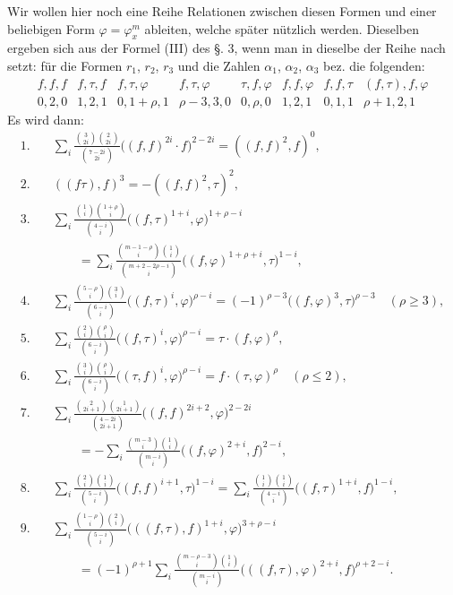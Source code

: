 \documentclass[10pt]{article}
\begin{document}
Wir wollen hier noch eine Reihe Relationen zwischen diesen Formen und einer beliebigen Form $\varphi=\varphi_x^m$ ableiten, welche später nützlich werden. Dieselben ergeben sich aus der Formel (III) des §. 3, wenn man in dieselbe der Reihe nach setzt: für die Formen $r_1$, $r_2$, $r_3$ und die Zahlen $\alpha_1$, $\alpha_2$, $\alpha_3$ bez. die folgenden:
\[
\begin{array}{ccccccccc}
f,f,f&f,\tau,f&f,\tau,\varphi&f,\tau,\varphi&\tau,f,\varphi&f,f,\varphi&f,f,\tau&(f,\tau),f,\varphi\\
0,2,0&1,2,1&0,1+\rho,1&\rho-3,3,0&0,\rho,0&1,2,1&0,1,1&\rho+1,2,1
\end{array}
\]
Es wird dann:
\begin{align*}
1.\quad &\sum_i\frac{\binom{3}{2i}\binom{2}{2i}}{\binom{7-2i}{2i}}\bigl((f,f)^{2i}\cdot f\bigr)^{2-2i}=((f,f)^2,f)^0,\\
2.\quad &((f\tau),f)^3=-((f,f)^2,\tau)^2,\\
3.\quad &\sum_i\frac{\binom{1}{i}\binom{1+\rho}{i}}{\binom{4-i}{i}}\bigl((f,\tau)^{1+i},\varphi\bigr)^{1+\rho-i}\\
&\qquad=\sum_i\frac{\binom{m-1-\rho}{i}\binom{1}{i}}{\binom{m+2-2\rho-i}{i}}\bigl((f,\varphi)^{1+\rho+i},\tau\bigr)^{1-i},\\
4.\quad &\sum_i\frac{\binom{5-\rho}{i}\binom{3}{i}}{\binom{6-i}{i}}\bigl((f,\tau)^i,\varphi\bigr)^{\rho-i}=(-1)^{\rho-3}\bigl((f,\varphi)^3,\tau\bigr)^{\rho-3}\quad(\rho\geq 3),\\
5.\quad &\sum_i\frac{\binom{2}{i}\binom{\rho}{i}}{\binom{6-i}{i}}\bigl((f,\tau)^i,\varphi\bigr)^{\rho-i}=\tau\cdot(f,\varphi)^\rho,\\
6.\quad &\sum_i\frac{\binom{3}{i}\binom{\rho}{i}}{\binom{6-i}{i}}\bigl((\tau,f)^i,\varphi\bigr)^{\rho-i}=f\cdot(\tau,\varphi)^\rho\quad(\rho\leq 2),\\
7.\quad &\sum_i\frac{\binom{2}{2i+1}\binom{1}{2i+1}}{\binom{4-2i}{2i+1}}\bigl((f,f)^{2i+2},\varphi\bigr)^{2-2i}\\
&\qquad=-\sum_i\frac{\binom{m-3}{i}\binom{1}{i}}{\binom{m-i}{i}}\bigl((f,\varphi)^{2+i},f\bigr)^{2-i},\\
8.\quad &\sum_i\frac{\binom{2}{i}\binom{1}{i}}{\binom{5-i}{i}}\bigl((f,f)^{i+1},\tau\bigr)^{1-i}
=\sum_i\frac{\binom{1}{i}\binom{1}{i}}{\binom{4-i}{i}}\bigl((f,\tau)^{1+i},f\bigr)^{1-i},\\
9.\quad &\sum_i\frac{\binom{1-\rho}{i}\binom{2}{i}}{\binom{5-i}{i}}\bigl(((f,\tau),f)^{1+i},\varphi\bigr)^{3+\rho-i}\\
&\qquad=(-1)^{\rho+1}\sum_i\frac{\binom{m-\rho-3}{i}\binom{1}{i}}{\binom{m-i}{i}}\bigl(((f,\tau),\varphi)^{2+i},f\bigr)^{\rho+2-i}.
\end{align*}
\end{document}
